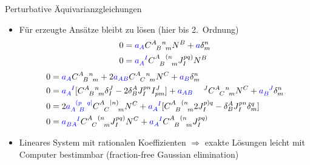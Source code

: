 \documentclass{beamer}
\newcommand{\gmc}[4]{\ensuremath{C^{#1\hphantom{#2}#3}_{\hphantom{#1}{#2}\hphantom{#3}#4}}}
\begin{document}
    \begin{frame}{Perturbative Äquivarianzgleichungen}
        \begin{itemize}
            \item Für erzeugte Ansätze bleibt zu lösen (hier bis 2.\ Ordnung)
            \begin{align*}
                0 &{} = {\color{blue}a_A} \gmc{A}{B}{n}{m} N^B + {\color{blue}a} \delta^n_m \\
                0 &{} = {\color{blue}a_A^{\hphantom AI}}\gmc{A}{B}{(n}{m} J^{pq)}_I N^B
            \end{align*}
            \begin{align*}
                0 &{} = {\color{blue}a_A} \gmc{A}{B}{n}{m} + 2 {\color{blue}a_{AB}} \gmc{A}{C}{n}{m} N^C + {\color{blue}a_B} \delta^n_m \\
                0 &{} = {\color{blue}a_A^{\hphantom AI}}\lbrack \gmc{A}{B}{n}{m} \delta^J_I - 2\delta^A_B J^{pn}_I I^J_{pm}\rbrack + {\color{blue}a_{AB}}^{\hphantom{AB}J}\gmc{A}{C}{n}{m} N^C + {\color{blue}a_B^{\hphantom BJ}} \delta^n_m \\
                0 &{} = 2{\color{blue}a_{A \hphantom pB}^{\hphantom A(p\hphantom Bq\mid}} \gmc{A}{C}{\mid n)}{m} N^C + {\color{blue}a_A^{\hphantom AI}}\lbrack \gmc{A}{B}{(n}{m} 2J^{p)q}_I - \delta^A_B J^{pn}_I \delta^q_m\rbrack \\
                0 &{} = {\color{blue}a_{BA}^{\hphantom{BA}I}} \gmc{A}{C}{(n}{m} J^{pq)}_I N^C + {\color{blue}a_A^{\hphantom AI}}\gmc{A}{B}{(n}{m} J^{pq)}_I
            \end{align*}
            \item Lineares System mit rationalen Koeffizienten $\Rightarrow$ exakte Lösungen leicht mit
            Computer bestimmbar (fraction-free Gaussian elimination)
        \end{itemize}
    \end{frame}
\end{document}
